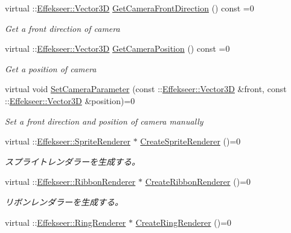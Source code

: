 \begin{DoxyCompactItemize}
virtual \+::\mbox{\hyperlink{struct_effekseer_1_1_vector3_d}{Effekseer\+::\+Vector3D}} \mbox{\hyperlink{class_effekseer_renderer_1_1_renderer_a84c523a3a5fbcba9d8af3de01f8dfbfb}{Get\+Camera\+Front\+Direction}} () const =0
\begin{DoxyCompactList}\small\item\em Get a front direction of camera \end{DoxyCompactList}\item 
virtual \+::\mbox{\hyperlink{struct_effekseer_1_1_vector3_d}{Effekseer\+::\+Vector3D}} \mbox{\hyperlink{class_effekseer_renderer_1_1_renderer_a904d639bb441e9221fd5421c1b75da71}{Get\+Camera\+Position}} () const =0
\begin{DoxyCompactList}\small\item\em Get a position of camera \end{DoxyCompactList}\item 
virtual void \mbox{\hyperlink{class_effekseer_renderer_1_1_renderer_aab9cecfcbbc9c3c0a968ce47704fc157}{Set\+Camera\+Parameter}} (const \+::\mbox{\hyperlink{struct_effekseer_1_1_vector3_d}{Effekseer\+::\+Vector3D}} \&front, const \+::\mbox{\hyperlink{struct_effekseer_1_1_vector3_d}{Effekseer\+::\+Vector3D}} \&position)=0
\begin{DoxyCompactList}\small\item\em Set a front direction and position of camera manually \end{DoxyCompactList}\item 
virtual \+::\mbox{\hyperlink{class_effekseer_1_1_sprite_renderer}{Effekseer\+::\+Sprite\+Renderer}} $\ast$ \mbox{\hyperlink{class_effekseer_renderer_1_1_renderer_abecf62202fe3d54f4edf6c43d701188b}{Create\+Sprite\+Renderer}} ()=0
\begin{DoxyCompactList}\small\item\em スプライトレンダラーを生成する。 \end{DoxyCompactList}\item 
virtual \+::\mbox{\hyperlink{class_effekseer_1_1_ribbon_renderer}{Effekseer\+::\+Ribbon\+Renderer}} $\ast$ \mbox{\hyperlink{class_effekseer_renderer_1_1_renderer_ac65157c02f8936e054c2525e4722a4f7}{Create\+Ribbon\+Renderer}} ()=0
\begin{DoxyCompactList}\small\item\em リボンレンダラーを生成する。 \end{DoxyCompactList}\item 
virtual \+::\mbox{\hyperlink{class_effekseer_1_1_ring_renderer}{Effekseer\+::\+Ring\+Renderer}} $\ast$ \mbox{\hyperlink{class_effekseer_renderer_1_1_renderer_a84dec1c70cab5984ce151753b5c9bcb9}{Create\+Ring\+Renderer}} ()=0

\end{DoxyCompactItemize}
